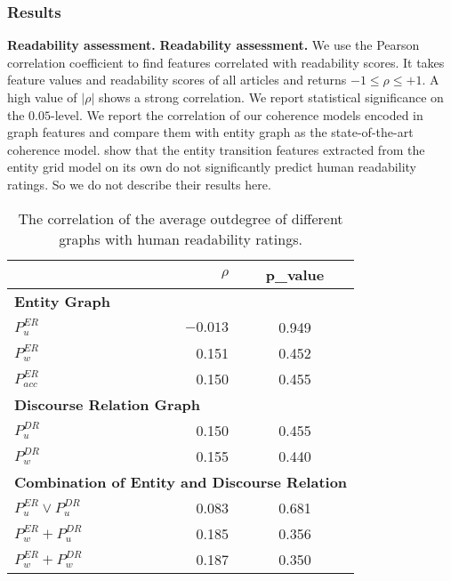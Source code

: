 \subsubsection{Results}\label{subsec:results}
%
\textbf{Readability assessment.}  
\noindent
\textbf{Readability assessment.} We use the Pearson correlation coefficient to find features correlated with readability scores. 
It takes feature values and readability scores of all articles and returns $-1\leq\rho\leq+1$. 
A high value of $|\rho|$ shows a strong correlation. 
We report statistical significance on the $0.05$-level. 
We report the correlation of our coherence models encoded in graph features and compare them with  entity graph as the state-of-the-art coherence model. 
 show that the entity transition features extracted from the entity grid model \cite{barzilay08} on its own do not significantly predict human
readability ratings. 
So we do not describe their results here.

\begin{table}[!t]
\centering
\begin{small}
\begin{tabular}{lrc}
\hline
                        & $\rho$                & p\_value\\\hline
        \multicolumn{3}{l}{\textbf{Entity Graph}}\\
 $P_u^{ER}$             & $-0.013$ & 0.949 \\
 $P_w^{ER}$             & 0.151  & 0.452\\
 $P_{acc}^{ER}$ & 0.150         & 0.455\\
\hline
\multicolumn{3}{l}{\textbf{Discourse Relation Graph}}\\
 $P_u^{DR}$ &  0.150 & 0.455\\
 $P_w^{DR}$ &  0.155  & 0.440\\\hline
 \multicolumn{3}{l}{\textbf{Combination of Entity and Discourse Relation}}\\
 $P_u^{ER} \lor P_u^{DR}$  &  0.083 & 0.681\\
 $P_w^{ER} + P_u^{DR}$ & 0.185  & 0.356\\
 $P_w^{ER} + P_w^{DR}$ & 0.187  & 0.350\\\hline
\end{tabular}
\end{small}
\caption{The correlation of the average outdegree of different graphs with human readability ratings.}
  \label{t:OD_pearson}
\end{table}

